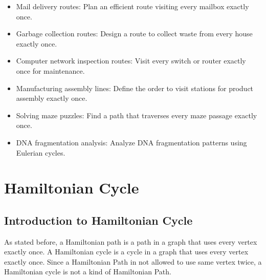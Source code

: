 \documentclass[14pt, times, a4paper]{extarticle}
\begin{document}
\begin{itemize}
\item Mail delivery routes: Plan an efficient route visiting every mailbox exactly once.
\item Garbage collection routes: Design a route to collect waste from every house exactly once.
\item Computer network inspection routes: Visit every switch or router exactly once for maintenance.
\item Manufacturing assembly lines: Define the order to visit stations for product assembly exactly once.
\item Solving maze puzzles: Find a path that traverses every maze passage exactly once.
\item DNA fragmentation analysis: Analyze DNA fragmentation patterns using Eulerian cycles.
\end{itemize}
\newpage
\section{Hamiltonian Cycle}


\subsection{Introduction to Hamiltonian Cycle}
As stated before, a \gls{Hamiltonian path} is a path in a graph that uses every vertex exactly once. A Hamiltonian cycle is a cycle in a graph that uses every vertex exactly once. Since a Hamiltonian Path in not allowed to use same vertex twice, a Hamiltonian cycle is not a kind of Hamiltonian Path.


\end{document}
